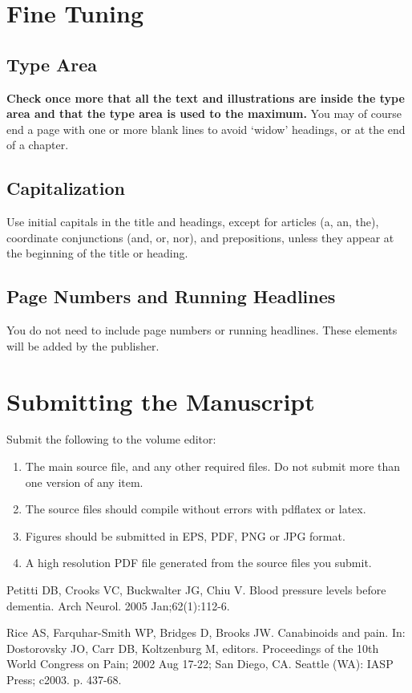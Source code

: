 \documentclass{IOS-Book-Article}
\begin{document}
\section{Fine Tuning}

\subsection{Type Area}
\textbf{Check once more that all the text and illustrations are inside the type area and
that the type area is used to the maximum.} You may of course end a page with one
or more blank lines to avoid `widow' headings, or at the end of a chapter.

\subsection{Capitalization}
Use initial capitals in the title and headings, except for articles (a, an, the), coordinate
conjunctions (and, or, nor), and prepositions, unless they appear at the beginning of the
title or heading.

\subsection{Page Numbers and Running Headlines}
You do not need to include page numbers or running headlines. These elements will be
added by the publisher.

\section{Submitting the Manuscript}
Submit the following to the volume editor:

\begin{enumerate}
\item The main source file, and any other required files. Do not submit more than
one version of any item.

\item The source files should compile without errors with pdflatex or latex.

\item Figures should be submitted in EPS, PDF, PNG or JPG format.

\item A high resolution PDF file generated from the source files you submit.
\end{enumerate}

\begin{thebibliography}{99}


Petitti DB, Crooks VC, Buckwalter JG, Chiu V. Blood pressure levels before dementia. 
Arch Neurol. 2005 Jan;62(1):112-6.

Rice AS, Farquhar-Smith WP, Bridges D, Brooks JW. Canabinoids and pain. In: Dostorovsky JO, 
Carr DB, Koltzenburg M, editors. Proceedings of the 10th World Congress on Pain;  2002 Aug 
17-22; San Diego, CA. Seattle (WA): IASP Press; c2003. p. 437-68.

\end{thebibliography}
\end{document}
